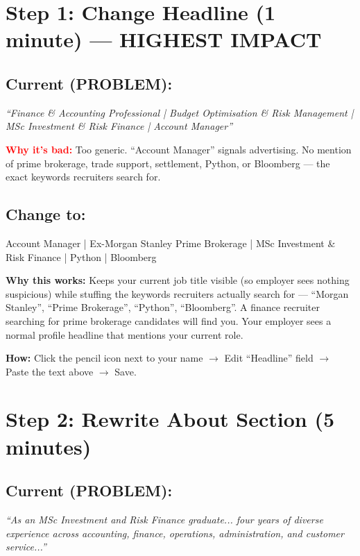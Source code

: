 \documentclass[11pt,a4paper]{article}
\begin{document}
\section{Step 1: Change Headline (1 minute) --- HIGHEST IMPACT}

\subsection{Current (PROBLEM):}
{\small\textit{``Finance \& Accounting Professional | Budget Optimisation \& Risk Management | MSc Investment \& Risk Finance | Account Manager''}}

\textcolor{red}{\bfseries Why it's bad:} Too generic. ``Account Manager'' signals advertising. No mention of prime brokerage, trade support, settlement, Python, or Bloomberg --- the exact keywords recruiters search for.

\subsection{Change to:}
\begin{copybox}
Account Manager | Ex-Morgan Stanley Prime Brokerage | MSc Investment \& Risk Finance | Python | Bloomberg
\end{copybox}

{\small\textbf{Why this works:} Keeps your current job title visible (so employer sees nothing suspicious) while stuffing the keywords recruiters actually search for --- ``Morgan Stanley'', ``Prime Brokerage'', ``Python'', ``Bloomberg''. A finance recruiter searching for prime brokerage candidates will find you. Your employer sees a normal profile headline that mentions your current role.}

\textbf{How:} Click the pencil icon next to your name $\rightarrow$ Edit ``Headline'' field $\rightarrow$ Paste the text above $\rightarrow$ Save.

\section{Step 2: Rewrite About Section (5 minutes)}

\subsection{Current (PROBLEM):}
{\small\textit{``As an MSc Investment and Risk Finance graduate... four years of diverse experience across accounting, finance, operations, administration, and customer service...''}}
\end{document}
